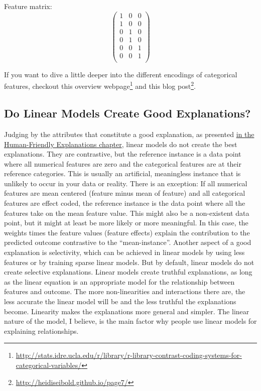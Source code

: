 \documentclass[
  10pt,
]{scrbook}
\renewcommand{\href}[2]{#2\footnote{\url{#1}}}
\begin{document}
Feature matrix: \[\begin{pmatrix}1&0&0\\1&0&0\\0&1&0\\0&1&0\\0&0&1\\0&0&1\\\end{pmatrix}\]

If you want to dive a little deeper into the different encodings of categorical features, checkout \href{http://stats.idre.ucla.edu/r/library/r-library-contrast-coding-systems-for-categorical-variables/}{this overview webpage} and
\href{http://heidiseibold.github.io/page7/}{this blog post}.

\hypertarget{do-linear-models-create-good-explanations}{%
\subsection{Do Linear Models Create Good Explanations?}\label{do-linear-models-create-good-explanations}}

Judging by the attributes that constitute a good explanation, as presented \protect\hyperlink{good-explanation}{in the Human-Friendly Explanations chapter}, linear models do not create the best explanations.
They are contrastive, but the reference instance is a data point where all numerical features are zero and the categorical features are at their reference categories.
This is usually an artificial, meaningless instance that is unlikely to occur in your data or reality.
There is an exception:
If all numerical features are mean centered (feature minus mean of feature) and all categorical features are effect coded, the reference instance is the data point where all the features take on the mean feature value.
This might also be a non-existent data point, but it might at least be more likely or more meaningful.
In this case, the weights times the feature values (feature effects) explain the contribution to the predicted outcome contrastive to the ``mean-instance''.
Another aspect of a good explanation is selectivity, which can be achieved in linear models by using less features or by training sparse linear models.
But by default, linear models do not create selective explanations.
Linear models create truthful explanations, as long as the linear equation is an appropriate model for the relationship between features and outcome.
The more non-linearities and interactions there are, the less accurate the linear model will be and the less truthful the explanations become.
Linearity makes the explanations more general and simpler.
The linear nature of the model, I believe, is the main factor why people use linear models for explaining relationships.
\end{document}
